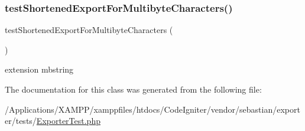 \subsubsection{\texorpdfstring{test\+Shortened\+Export\+For\+Multibyte\+Characters()}{testShortenedExportForMultibyteCharacters()}}
{\footnotesize\ttfamily test\+Shortened\+Export\+For\+Multibyte\+Characters (\begin{DoxyParamCaption}{ }\end{DoxyParamCaption})}

extension mbstring 

The documentation for this class was generated from the following file\+:\begin{DoxyCompactItemize}
\item 
/\+Applications/\+X\+A\+M\+P\+P/xamppfiles/htdocs/\+Code\+Igniter/vendor/sebastian/exporter/tests/\mbox{\hyperlink{_exporter_test_8php}{Exporter\+Test.\+php}}\end{DoxyCompactItemize}
